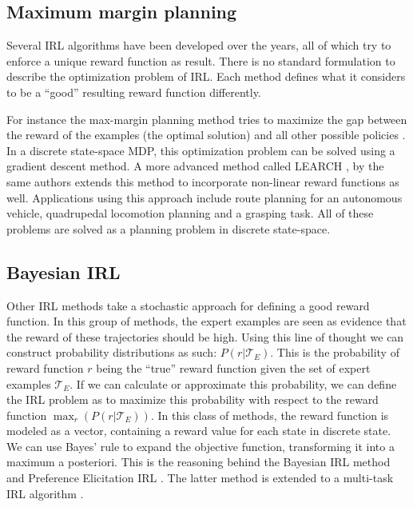 \documentclass[mscThesis.tex]{subfiles}
\begin{document}
\subsection{Maximum margin planning}
Several IRL algorithms have been developed over the years, all of which try to enforce a unique reward function as result. There is no standard formulation to describe the optimization problem of IRL. Each method defines what it considers to be a ``good'' resulting reward function differently. 

For instance the max-margin planning method tries to maximize the gap between the reward of the examples (the optimal solution) and all other possible policies \cite{RatliffBagnell2006}. In a discrete state-space MDP, this optimization problem can be solved using a gradient descent method. A more advanced method called LEARCH \cite{Ratliff2009}, by the same authors extends this method to incorporate non-linear reward functions as well. Applications using this approach include route planning for an autonomous vehicle, quadrupedal locomotion planning and a grasping task. All of these problems are solved as a planning problem in discrete state-space. 


\subsection{Bayesian IRL}
Other IRL methods take a stochastic approach for defining a good reward function. In this group of methods, the expert examples are seen as evidence that the reward of these trajectories should be high. Using this line of thought we can construct probability distributions as such: $P(r | \mathcal{T}_E)$. This is the probability of reward function $r$ being the ``true'' reward function given the set of expert examples $\mathcal{T}_E$. If we can calculate or approximate this probability, we can define the IRL problem as to maximize this probability with respect to the reward function $\max_r \left(P(r | \mathcal{T}_E) \right)$. In this class of methods, the reward function is modeled as a vector, containing a reward value for each state in discrete state. We can use Bayes' rule to expand the objective function, transforming it into a maximum a posteriori. This is the reasoning behind the Bayesian IRL method \cite{RamachandranAmir2007} and Preference Elicitation IRL \cite{rothkopf2011preference}. The latter method is extended to a multi-task IRL algorithm \cite{dimitrakakis2011bayesian}.
\end{document}
